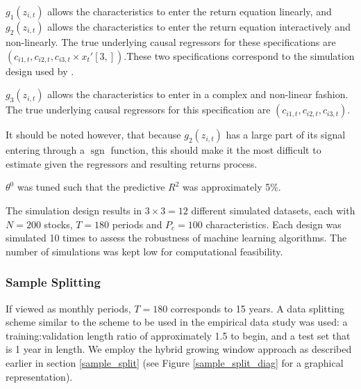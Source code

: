 \documentclass[11pt, a4paper, table]{article}
\begin{document}
$g_1 \left(z_{i, t}\right)$ allows the characteristics to enter the return equation linearly, and $g_2 \left(z_{i, t}\right)$ allows the characteristics to enter the return equation interactively and non-linearly. The true underlying causal regressors for these specifications are $\left(c_{i 1, t}, c_{i 2, t}, c_{i 3, t} \times x_{t}'[3,]\right)$.These two specifications correspond to the simulation design used by \cite{gu_empirical_2018}. 

$g_3 \left(z_{i, t}\right)$ allows the characteristics to enter in a complex and non-linear fashion. The true underlying causal regressors for this specification are $\left(c_{i 1, t}, c_{i 2, t}, c_{i 3, t} \right)$. 

It should be noted however, that because $g_2 \left(z_{i, t}\right)$ has a large part of its signal entering through a $\operatorname{sgn}$ function, this should make it the most difficult to estimate given the regressors and resulting returns process.

$\theta^0$ was tuned such that the predictive $R^2$ was approximately 5\%.

The simulation design results in $3 \times 3 = 12$ different simulated datasets, each with $N = 200$ stocks, $T = 180$ periods and $P_c = 100$ characteristics. Each design was simulated 10 times to assess the robustness of machine learning algorithms. The number of simulations was kept low for computational feasibility.

\subsubsection{Sample Splitting}

If viewed as monthly periods, $T = 180$ corresponds to 15 years. A data splitting scheme similar to the scheme to be used in the empirical data study was used: a training:validation length ratio of approximately 1.5 to begin, and a test set that is 1 year in length. We employ the hybrid growing window approach as described earlier in section \ref{sample_split} (see Figure \ref{sample_split_diag} for a graphical representation).
\end{document}
